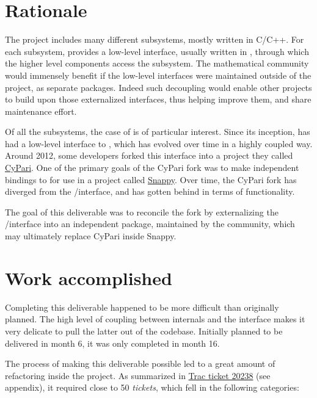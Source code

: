 \documentclass{deliverablereport}
\author{Luca De Feo, Vincent Delecroix, and Jeroen Demeyer}
\begin{document}
\enlargethispage{4ex}
\maketitle
\githubissuedescription
\tableofcontents\newpage


\section{Rationale}

The \Sage project includes many different subsystems, mostly written
in C/C++. For each subsystem, \Sage provides a low-level interface,
usually written in \Cython, through which the higher level components
access the subsystem. The mathematical community would immensely
benefit if the low-level interfaces were maintained outside of the
\Sage project, as separate \Python packages. Indeed such decoupling
would enable other \Python projects to build upon those externalized
interfaces, thus helping improve them, and share maintenance effort.

Of all the subsystems, the case of \Pari is of particular
interest. Since its inception, \Sage has had a low-level \Cython
interface to \Pari, which has evolved over time in a highly coupled
way. Around 2012, some \Sage developers forked this interface into a
project they called
\href{https://bitbucket.org/t3m/cypari/}{CyPari}. One of the primary
goals of the CyPari fork was to make independent \Python bindings to
\Pari for use in a project called
\href{https://bitbucket.org/t3m/snappy}{Snappy}. Over time, the CyPari
fork has diverged from the \Sage/\Pari interface, and has gotten
behind in terms of functionality.

The goal of this deliverable was to reconcile the fork by
externalizing the \Sage/\Pari interface into an independent package,
maintained by the \Sage community, which may ultimately replace CyPari
inside Snappy. 


\section{Work accomplished}

Completing this deliverable happened to be more difficult than
originally planned. The high level of coupling between \Sage internals
and the \Pari interface makes it very delicate to pull the latter out
of the \Sage codebase. Initially planned to be delivered in month 6,
it was only completed in month 16.

The process of making this deliverable possible led to a great amount
of refactoring inside the \Sage project. As summarized in
\href{http://trac.sagemath.org/ticket/20238}{Trac ticket 20238} (see
appendix), it required close to 50 \emph{tickets}, which fell in the
following categories:
\end{document}
